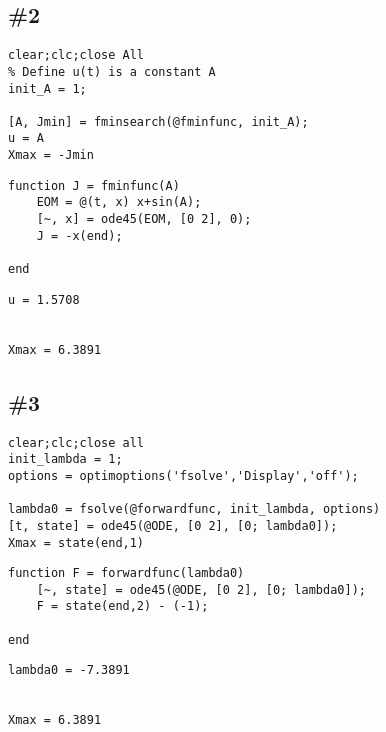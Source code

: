 \documentclass[12pt]{article}
\begin{document}



\subsection*{\#2}

\begin{verbatim}
clear;clc;close All
% Define u(t) is a constant A
init_A = 1;

[A, Jmin] = fminsearch(@fminfunc, init_A);
u = A
Xmax = -Jmin
\end{verbatim}

\begin{verbatim}
function J = fminfunc(A)
    EOM = @(t, x) x+sin(A);
    [~, x] = ode45(EOM, [0 2], 0);
    J = -x(end);

end
\end{verbatim}

        \color{lightgray} \begin{verbatim}
u = 1.5708


Xmax = 6.3891
\end{verbatim} \color{black}


\subsection*{\#3}

\begin{verbatim}
clear;clc;close all
init_lambda = 1;
options = optimoptions('fsolve','Display','off');

lambda0 = fsolve(@forwardfunc, init_lambda, options)
[t, state] = ode45(@ODE, [0 2], [0; lambda0]);
Xmax = state(end,1)
\end{verbatim}

\begin{verbatim}
function F = forwardfunc(lambda0)
    [~, state] = ode45(@ODE, [0 2], [0; lambda0]);
    F = state(end,2) - (-1);

end
\end{verbatim}

        \color{lightgray} \begin{verbatim}
lambda0 = -7.3891


Xmax = 6.3891
\end{verbatim} \color{black}


\end{document}

